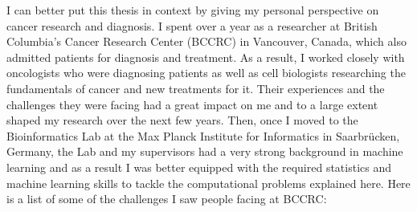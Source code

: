 I can better put this thesis in context by giving my personal perspective on
cancer research and diagnosis. I spent over a year as a researcher at British
Columbia's Cancer Research Center (BCCRC) in Vancouver, Canada, which also
admitted patients for diagnosis and treatment. As a result, I worked closely
with oncologists who were diagnosing patients as well as cell biologists
researching the fundamentals of cancer and new treatments for it. Their
experiences and the challenges they were facing had a great impact on me and to
a large extent shaped my research over the next few years. Then, once I moved
to the Bioinformatics Lab at the Max Planck Institute for Informatics in
Saarbr\"ucken, Germany, the Lab and my supervisors had a very strong background
in machine learning and as a result I was better equipped with the required
statistics and machine learning skills to tackle the computational problems
explained here. Here is a list of some of the challenges I saw people facing at
BCCRC:

